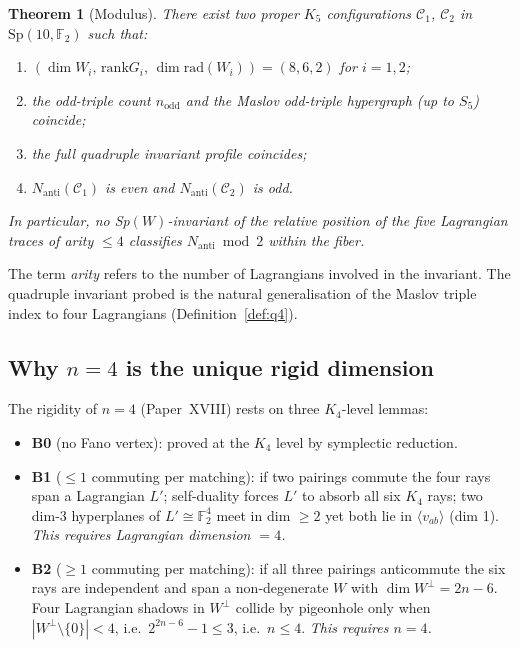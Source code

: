 \documentclass[11pt,a4paper]{article}
\newtheorem{theorem}{Theorem}[section]
\theoremstyle{remark}
\newcommand{\Sp}{\mathrm{Sp}}
\newcommand{\rad}{\mathrm{rad}}
\newcommand{\rank}{\mathrm{rank}}
\newcommand{\Nanti}{N_{\mathrm{anti}}}
\begin{document}
\begin{theorem}[Modulus]\label{thm:modulus}
There exist two proper $K_5$ configurations $\mathcal C_1$, $\mathcal C_2$ in
$\Sp(10,\mathbb F_2)$ such that:
\begin{enumerate}
\item $(\dim W_i,\, \rank G_i,\, \dim\rad(W_i)) = (8,6,2)$ for $i=1,2$;
\item the odd-triple count $n_{\mathrm{odd}}$ and the Maslov odd-triple
  hypergraph (up to $S_5$) coincide;
\item the full quadruple invariant profile coincides;
\item $\Nanti(\mathcal C_1)$ is even and $\Nanti(\mathcal C_2)$ is odd.
\end{enumerate}
In particular, no Sp$(W)$-invariant of the relative position of the five Lagrangian
traces of \emph{arity $\le4$} classifies $\Nanti\bmod2$ within the fiber.
\end{theorem}

The term \emph{arity} refers to the number of Lagrangians involved in the invariant.
The quadruple invariant probed is the natural generalisation of the Maslov triple index
to four Lagrangians (Definition~\ref{def:q4}).

\subsection*{Why $n=4$ is the unique rigid dimension}

The rigidity of $n=4$ (Paper~XVIII) rests on three $K_4$-level lemmas:

\begin{itemize}
\item \textbf{B0} (no Fano vertex): proved at the $K_4$ level by symplectic reduction.
\item \textbf{B1} ($\le1$ commuting per matching): if two pairings commute the four
  rays span a Lagrangian $L'$; self-duality forces $L'$ to absorb all six $K_4$ rays;
  two dim-3 hyperplanes of $L'\cong\mathbb F_2^4$ meet in dim $\ge2$ yet both lie in
  $\langle v_{ab}\rangle$ (dim 1).  \emph{This requires Lagrangian dimension $=4$.}
\item \textbf{B2} ($\ge1$ commuting per matching): if all three pairings anticommute the
  six rays are independent and span a non-degenerate $W$ with $\dim W^\perp=2n-6$.
  Four Lagrangian shadows in $W^\perp$ collide by pigeonhole only when $|W^\perp\setminus\{0\}|<4$,
  i.e.\ $2^{2n-6}-1\le3$, i.e.\ $n\le4$.  \emph{This requires $n=4$.}
\end{itemize}
\end{document}
